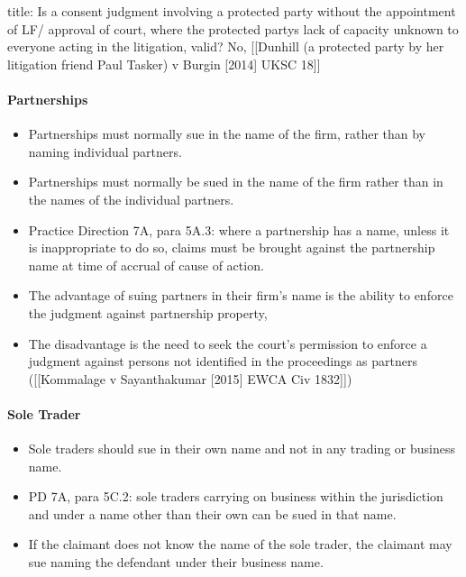 \documentclass[
]{article}
\newenvironment{Shaded}{}{}
\newcommand{\NormalTok}[1]{#1}
\providecommand{\tightlist}{%
  \setlength{\itemsep}{0pt}\setlength{\parskip}{0pt}}
\begin{document}
\begin{Shaded}
\begin{Highlighting}[]
\NormalTok{title: Is a consent judgment involving a protected party without the appointment of LF/ approval of court, where the protected party\textquotesingle{}s lack of capacity unknown to everyone acting in the litigation, valid?}
\NormalTok{No, [[Dunhill (a protected party by her litigation friend Paul Tasker) v Burgin [2014] UKSC 18]]}
\end{Highlighting}
\end{Shaded}

\hypertarget{partnerships}{%
\paragraph{Partnerships}\label{partnerships}}

\begin{itemize}
\tightlist
\item
  Partnerships must normally sue in the name of the firm, rather than by
  naming individual partners.
\item
  Partnerships must normally be sued in the name of the firm rather than
  in the names of the individual partners.
\item
  Practice Direction 7A, para 5A.3: where a partnership has a name,
  unless it is inappropriate to do so, claims must be brought against
  the partnership name at time of accrual of cause of action.
\item
  The advantage of suing partners in their firm's name is the ability to
  enforce the judgment against partnership property,
\item
  The disadvantage is the need to seek the court's permission to enforce
  a judgment against persons not identified in the proceedings as
  partners ({[}{[}Kommalage v Sayanthakumar {[}2015{]} EWCA Civ
  1832{]}{]})
\end{itemize}

\hypertarget{sole-trader}{%
\paragraph{Sole Trader}\label{sole-trader}}

\begin{itemize}
\tightlist
\item
  Sole traders should sue in their own name and not in any trading or
  business name.
\item
  PD 7A, para 5C.2: sole traders carrying on business within the
  jurisdiction and under a name other than their own can be sued in that
  name.
\item
  If the claimant does not know the name of the sole trader, the
  claimant may sue naming the defendant under their business name.
\end{itemize}
\end{document}
